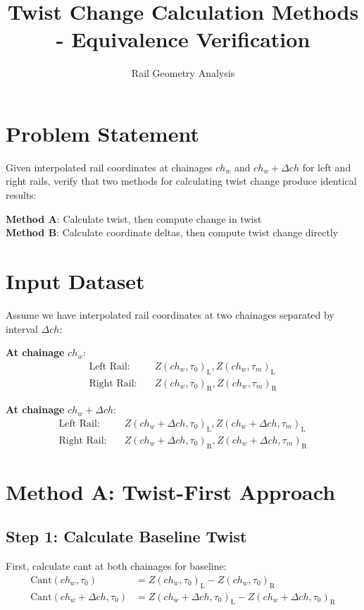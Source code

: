 \documentclass{article}
\title{Twist Change Calculation Methods - Equivalence Verification}
\author{Rail Geometry Analysis}
\date{}
\newcommand{\chainage}[1]{ch_{#1}}
\newcommand{\time}[1]{\tau_{#1}}
\newcommand{\Left}{\text{L}}
\newcommand{\Right}{\text{R}}
\newcommand{\Z}[3]{Z(#1, #2)_{#3}}
\newcommand{\Cant}[2]{\text{Cant}(#1, #2)}
\begin{document}
\maketitle

\section{Problem Statement}
Given interpolated rail coordinates at chainages $\chainage{w}$ and $\chainage{w} + \Delta ch$ for left and right rails, verify that two methods for calculating twist change produce identical results:

\textbf{Method A}: Calculate twist, then compute change in twist\\
\textbf{Method B}: Calculate coordinate deltas, then compute twist change directly

\section{Input Dataset}
Assume we have interpolated rail coordinates at two chainages separated by interval $\Delta ch$:

\textbf{At chainage} $\chainage{w}$:
\begin{align}
\text{Left Rail:} \quad &\Z{\chainage{w}}{\time{0}}{\Left}, \Z{\chainage{w}}{\time{m}}{\Left} \\
\text{Right Rail:} \quad &\Z{\chainage{w}}{\time{0}}{\Right}, \Z{\chainage{w}}{\time{m}}{\Right}
\end{align}

\textbf{At chainage} $\chainage{w} + \Delta ch$:
\begin{align}
\text{Left Rail:} \quad &\Z{\chainage{w} + \Delta ch}{\time{0}}{\Left}, \Z{\chainage{w} + \Delta ch}{\time{m}}{\Left} \\
\text{Right Rail:} \quad &\Z{\chainage{w} + \Delta ch}{\time{0}}{\Right}, \Z{\chainage{w} + \Delta ch}{\time{m}}{\Right}
\end{align}

\section{Method A: Twist-First Approach}

\subsection{Step 1: Calculate Baseline Twist}
First, calculate cant at both chainages for baseline:
\begin{align}
\Cant{\chainage{w}}{\time{0}} &= \Z{\chainage{w}}{\time{0}}{\Left} - \Z{\chainage{w}}{\time{0}}{\Right} \\
\Cant{\chainage{w} + \Delta ch}{\time{0}} &= \Z{\chainage{w} + \Delta ch}{\time{0}}{\Left} - \Z{\chainage{w} + \Delta ch}{\time{0}}{\Right}
\end{align}
\end{document}
